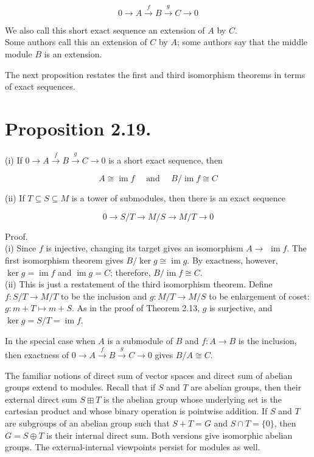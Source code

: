 \documentclass[10pt]{article}
\begin{document}
$$
0 \rightarrow A \xrightarrow{f} B \xrightarrow{g} C \rightarrow 0
$$

We also call this short exact sequence an extension of $A$ by $C$.\\
Some authors call this an extension of $C$ by $A$; some authors say that the middle module $B$ is an extension.

The next proposition restates the first and third isomorphism theorems in terms of exact sequences.

\section*{Proposition 2.19.}
(i) If $0 \rightarrow A \xrightarrow{f} B \xrightarrow{g} C \rightarrow 0$ is a short exact sequence, then

$$
A \cong \operatorname{im} f \quad \text { and } \quad B / \operatorname{im} f \cong C
$$

(ii) If $T \subseteq S \subseteq M$ is a tower of submodules, then there is an exact sequence

$$
0 \rightarrow S / T \rightarrow M / S \rightarrow M / T \rightarrow 0
$$

Proof.\\
(i) Since $f$ is injective, changing its target gives an isomorphism $A \rightarrow$ $\operatorname{im} f$. The first isomorphism theorem gives $B / \operatorname{ker} g \cong \operatorname{im} g$. By exactness, however, $\operatorname{ker} g=\operatorname{im} f$ and $\operatorname{im} g=C$; therefore, $B / \operatorname{im} f \cong C$.\\
(ii) This is just a restatement of the third isomorphism theorem. Define $f: S / T \rightarrow M / T$ to be the inclusion and $g: M / T \rightarrow M / S$ to be enlargement of coset: $g: m+T \mapsto m+S$. As in the proof of Theorem 2.13, $g$ is surjective, and $\operatorname{ker} g=S / T=\operatorname{im} f$.

In the special case when $A$ is a submodule of $B$ and $f: A \rightarrow B$ is the inclusion, then exactness of $0 \rightarrow A \xrightarrow{f} B \xrightarrow{g} C \rightarrow 0$ gives $B / A \cong C$.

The familiar notions of direct sum of vector spaces and direct sum of abelian groups extend to modules. Recall that if $S$ and $T$ are abelian groups, then their external direct sum $S \boxplus T$ is the abelian group whose underlying set is the cartesian product and whose binary operation is pointwise addition. If $S$ and $T$ are subgroups of an abelian group such that $S+T=G$ and $S \cap T=\{0\}$, then $G=S \oplus T$ is their internal direct sum. Both versions give isomorphic abelian groups. The external-internal viewpoints persist for modules as well.
\end{document}
